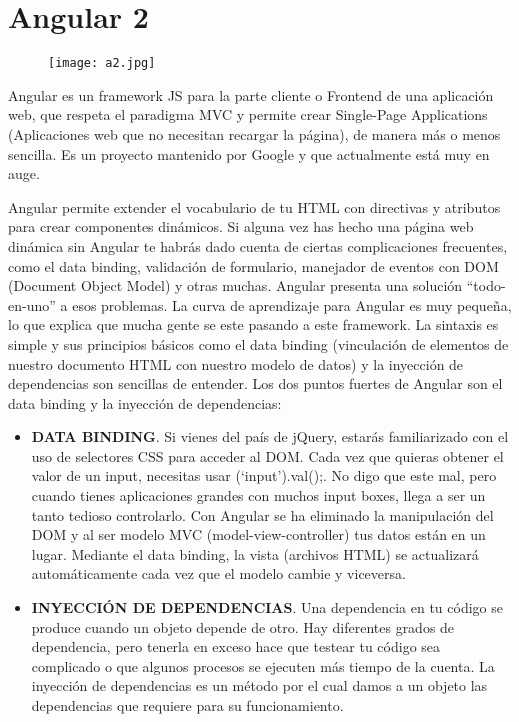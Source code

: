 \section{Angular 2}

\begin{figure}[H]
    \centering
    \texttt{[image: a2.jpg]}
\end{figure}
Angular es un framework JS para la parte cliente o Frontend de una aplicación web, que respeta el paradigma MVC y permite crear Single-Page Applications (Aplicaciones web que no necesitan recargar la página), de manera más o menos sencilla. Es un proyecto mantenido por Google y que actualmente está muy en auge.

Angular permite extender el vocabulario de tu HTML con directivas y atributos para crear componentes dinámicos. Si alguna vez has hecho una página web dinámica sin Angular te habrás dado cuenta de ciertas complicaciones frecuentes, como el data binding, validación de formulario, manejador de eventos con DOM (Document Object Model) y otras muchas. Angular presenta una solución “todo-en-uno” a esos problemas.
La curva de aprendizaje para Angular es muy pequeña, lo que explica que mucha gente se este pasando a este framework. La sintaxis es simple y sus principios básicos como el data binding (vinculación de elementos de nuestro documento HTML con nuestro modelo de datos) y la inyección de dependencias son sencillas de entender.
Los dos puntos fuertes de Angular son el data binding y la inyección de dependencias:

\begin{itemize}

\item \textbf{DATA BINDING}. Si vienes del país de jQuery, estarás familiarizado con el uso de selectores CSS para acceder al DOM. Cada vez que quieras obtener el valor de un input, necesitas usar (‘input’).val();. No digo que este mal, pero cuando tienes aplicaciones grandes con muchos input boxes, llega a ser un tanto tedioso controlarlo.
Con Angular se ha eliminado la manipulación del DOM y al ser modelo MVC (model-view-controller) tus datos están en un lugar. Mediante el data binding, la vista (archivos HTML) se actualizará automáticamente cada vez que el modelo cambie y viceversa.
\item \textbf{INYECCIÓN DE DEPENDENCIAS}. Una dependencia en tu código se produce cuando un objeto depende de otro. Hay diferentes grados de dependencia, pero tenerla en exceso hace que testear tu código sea complicado o que algunos procesos se ejecuten más tiempo de la cuenta.
La inyección de dependencias es un método por el cual damos a un objeto las dependencias que requiere para su funcionamiento. 
\end{itemize}


